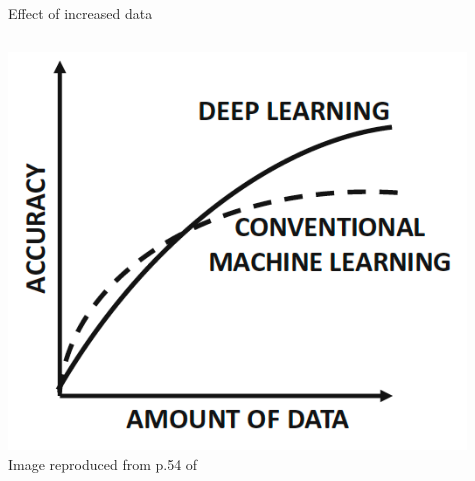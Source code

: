 \begin{frame}[t]{Effect of increased data}

    \begin{columns}
        \begin{column}{0.50\textwidth}
         \begin{center}
          \includegraphics[width=0.95\textwidth]{./images/dl_intro/accuracy_vs_amount_of_data_1.png}\\
          {\scriptsize \color{col:attribution} 
          Image reproduced from p.54 of \cite{Aggarwal:2018SpringerDL}}\\
         \end{center}
        \end{column}
        \begin{column}{0.50\textwidth}
        \end{column}
    \end{columns}

\end{frame}
